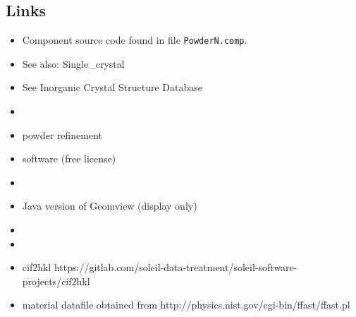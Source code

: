 \subsection*{Links}
\begin{itemize}
  \item Component source code found in file \texttt{PowderN.comp}.
  \item See also: Single\_crystal
  \item See  Inorganic Crystal Structure Database
  \item {}
  \item {} powder refinement
  \item {} software (free license)
  \item {}
  \item Java version of Geomview (display only) 
  \item {}
  \item {}
  \item cif2hkl https://gitlab.com/soleil-data-treatment/soleil-software-projects/cif2hkl
  \item material datafile obtained from http://physics.nist.gov/cgi-bin/ffast/ffast.pl
\end{itemize}
